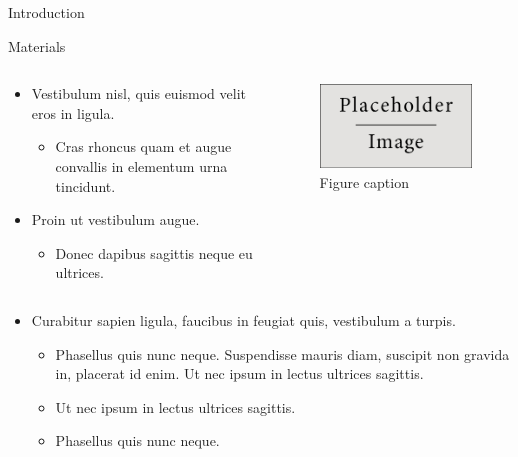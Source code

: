 \documentclass[final,hyperref={pdfpagelabels=false}]{beamer}
\begin{document}
\begin{frame}[t]
\begin{columns}[t]
\begin{column}{.465\textwidth}
\begin{block}{Introduction}
\end{block}


\begin{block}{Materials}

\begin{columns} %
\begin{column}{.54\textwidth} %
\begin{itemize}
\item Vestibulum nisl, quis euismod velit eros in ligula.
\begin{itemize}
\item Cras rhoncus quam et augue convallis in elementum urna tincidunt.
\end{itemize}
\item Proin ut vestibulum augue.
\begin{itemize}
\item Donec dapibus sagittis neque eu ultrices.
\end{itemize}
\end{itemize}
\end{column}

\begin{column}{.43\textwidth} %
\centering
\begin{figure}
\includegraphics[width=0.8\linewidth]{placeholder.jpg}
\caption{Figure caption}
\end{figure}
\end{column}
\end{columns} %

\begin{itemize}
\item Curabitur sapien ligula, faucibus in feugiat quis, vestibulum a turpis.
\begin{itemize}
\item Phasellus quis nunc neque. Suspendisse mauris diam, suscipit non gravida in, placerat id enim. Ut nec ipsum in lectus ultrices sagittis.
\item Ut nec ipsum in lectus ultrices sagittis.
\item Phasellus quis nunc neque.
\end{itemize}
\end{itemize}


\end{block}
\end{column}
\end{columns}
\end{frame}
\end{document}
